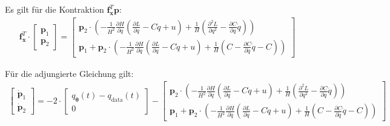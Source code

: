 \documentclass[a4paper, 12pt]{scrartcl}
\begin{document}
Es gilt für die Kontraktion $\bm{f}_{\bm{x}}^T \bm{p}$:
\begin{align*}
    \bm{f}_{\bm{x}}^T \cdot
    \begin{bmatrix}
        \bm{p}_1 \\
        \bm{p}_2
    \end{bmatrix}
    =
    \begin{bmatrix}
        \bm{p}_2
        \cdot
        \left(
            -\frac{1}{H^2} \frac{\partial H}{\partial q} 
            \left(
                \frac{\partial L}{\partial q} - C \dot{q} + u
            \right)
            + 
            \frac{1}{H}
            \left(
                \frac{\partial^2 L}{\partial q^2} - \frac{\partial C}{\partial q} \dot{q}
            \right)
        \right)
        \\
        \bm{p}_1 
        +
        \bm{p}_2
        \cdot
        \left(
            -\frac{1}{H^2} \frac{\partial H}{\partial \dot{q}} 
            \left(
                \frac{\partial L}{\partial q} - C \dot{q} + u
            \right)
            +
            \frac{1}{H}
            \left(
                C - \frac{\partial C}{\partial \dot{q}} \dot{q}
                - C
            \right)
        \right)
    \end{bmatrix}
\end{align*}

Für die adjungierte Gleichung gilt:
\begin{align*}
    \begin{bmatrix}
        \bm{\dot{p}}_1 \\
        \bm{\dot{p}}_2
    \end{bmatrix}
    =
    -2 \cdot
    \begin{bmatrix}
        q_{\bm{\theta}}(t) - q_{\text{data}}(t) \\
        0
    \end{bmatrix}
    - 
    \begin{bmatrix}
        \bm{p}_2
        \cdot
        \left(
            -\frac{1}{H^2} \frac{\partial H}{\partial q} 
            \left(
                \frac{\partial L}{\partial q} - C \dot{q} + u
            \right)
            + 
            \frac{1}{H}
            \left(
                \frac{\partial^2 L}{\partial q^2} - \frac{\partial C}{\partial q} \dot{q}
            \right)
        \right)
        \\
        \bm{p}_1 
        +
        \bm{p}_2
        \cdot
        \left(
            -\frac{1}{H^2} \frac{\partial H}{\partial \dot{q}} 
            \left(
                \frac{\partial L}{\partial q} - C \dot{q} + u
            \right)
            +
            \frac{1}{H}
            \left(
                C - \frac{\partial C}{\partial \dot{q}} \dot{q}
                - C
            \right)
        \right)
    \end{bmatrix}
\end{align*}
\end{document}
